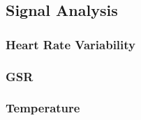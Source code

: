 \subsection{Signal Analysis}




\subsubsection{Heart Rate Variability}

\subsubsection{GSR}

\subsubsection{Temperature}
